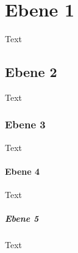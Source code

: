 \section{Ebene 1}
Text
\subsection{Ebene 2}
Text
\subsubsection{Ebene 3}
Text
\paragraph{Ebene 4}
Text
\subparagraph{Ebene 5}
Text
